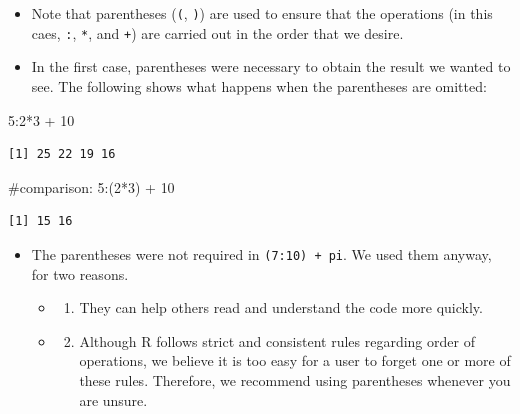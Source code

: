 \documentclass[
  9pt,
  a4paper,
  ignorenonframetext,
  notheorems]{beamer}
\newenvironment{Shaded}{\begin{snugshade}}{\end{snugshade}}
\newcommand{\CommentTok}[1]{\textcolor[rgb]{0.37,0.37,0.37}{#1}}
\newcommand{\DecValTok}[1]{\textcolor[rgb]{0.68,0.00,0.00}{#1}}
\newcommand{\NormalTok}[1]{\textcolor[rgb]{0.00,0.23,0.31}{#1}}
\newcommand{\SpecialCharTok}[1]{\textcolor[rgb]{0.37,0.37,0.37}{#1}}
\providecommand{\tightlist}{%
  \setlength{\itemsep}{0pt}\setlength{\parskip}{0pt}}\usepackage{longtable,booktabs,array}
\begin{document}
\begin{frame}[fragile]
\begin{itemize}
\item
  Note that parentheses (\texttt{(}, \texttt{)}) are used to ensure that
  the operations (in this caes, \texttt{:}, \texttt{*}, and \texttt{+})
  are carried out in the order that we desire.
\item
  In the first case, parentheses were necessary to obtain the result we
  wanted to see. The following shows what happens when the parentheses
  are omitted:
\end{itemize}

\begin{Shaded}
\begin{Highlighting}[]
\DecValTok{5}\SpecialCharTok{:}\DecValTok{2}\SpecialCharTok{*}\DecValTok{3} \SpecialCharTok{+} \DecValTok{10}
\end{Highlighting}
\end{Shaded}

\begin{verbatim}
[1] 25 22 19 16
\end{verbatim}

\begin{Shaded}
\begin{Highlighting}[]
\CommentTok{\#comparison:}
\DecValTok{5}\SpecialCharTok{:}\NormalTok{(}\DecValTok{2}\SpecialCharTok{*}\DecValTok{3}\NormalTok{) }\SpecialCharTok{+} \DecValTok{10}
\end{Highlighting}
\end{Shaded}

\begin{verbatim}
[1] 15 16
\end{verbatim}

\begin{itemize}
\tightlist
\item
  The parentheses were not required in \texttt{(7:10)\ +\ pi}. We used
  them anyway, for two reasons.

  \begin{itemize}
  \item
    \begin{enumerate}
    [(1)]
    \tightlist
    \item
      They can help others read and understand the code more quickly.
    \end{enumerate}
  \item
    \begin{enumerate}
    [(1)]
    \setcounter{enumi}{1}
    \tightlist
    \item
      Although R follows strict and consistent rules regarding order of
      operations, we believe it is too easy for a user to forget one or
      more of these rules. Therefore, we recommend using parentheses
      whenever you are unsure.
    \end{enumerate}
  \end{itemize}
\end{itemize}
\end{frame}
\end{document}
